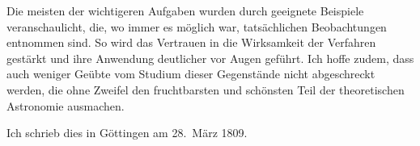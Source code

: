 Die meisten der wichtigeren Aufgaben wurden durch geeignete
Beispiele veranschaulicht, die, wo immer es möglich war, tatsächlichen Beobachtungen entnommen sind. So wird das Vertrauen in die Wirksamkeit der Verfahren gestärkt und ihre Anwendung deutlicher vor Augen geführt. Ich hoffe zudem, dass auch weniger Geübte vom Studium dieser Gegenstände nicht abgeschreckt werden, die ohne Zweifel den fruchtbarsten und schönsten Teil der theoretischen Astronomie ausmachen.

Ich schrieb dies in Göttingen am 28.~März 1809.
